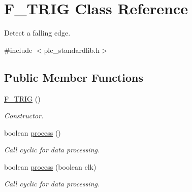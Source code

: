 \hypertarget{class_f___t_r_i_g}{\section{F\+\_\+\+T\+R\+I\+G Class Reference}
\label{class_f___t_r_i_g}
}


Detect a falling edge.  




{\ttfamily \#include $<$plc\+\_\+standardlib.\+h$>$}

\subsection*{Public Member Functions}
\begin{DoxyCompactItemize}
\item 
\hypertarget{class_f___t_r_i_g_ab9d75d228a8576d4a5866587626b0c9d}{\hyperlink{class_f___t_r_i_g_ab9d75d228a8576d4a5866587626b0c9d}{F\+\_\+\+T\+R\+I\+G} ()}\label{class_f___t_r_i_g_ab9d75d228a8576d4a5866587626b0c9d}

\begin{DoxyCompactList}\small\item\em Constructor. \end{DoxyCompactList}\item 
\hypertarget{class_f___t_r_i_g_a50728be6f5641d091c75c2bd5a865750}{boolean \hyperlink{class_f___t_r_i_g_a50728be6f5641d091c75c2bd5a865750}{process} ()}\label{class_f___t_r_i_g_a50728be6f5641d091c75c2bd5a865750}

\begin{DoxyCompactList}\small\item\em Call cyclic for data processing. \end{DoxyCompactList}\item 
boolean \hyperlink{class_f___t_r_i_g_ae90a3b6c8501582d1795761943d19f7f}{process} (boolean clk)
\begin{DoxyCompactList}\small\item\em Call cyclic for data processing. \end{DoxyCompactList}\end{DoxyCompactItemize}
